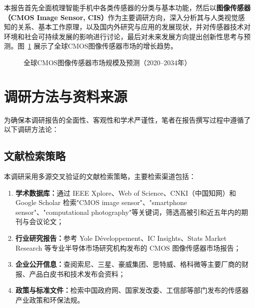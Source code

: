 \documentclass[12pt, a4paper]{ctexart}
\begin{document}
本报告首先全面梳理智能手机中各类传感器的分类与基本功能，然后以\textbf{图像传感器（CMOS Image Sensor, CIS）}作为主要调研方向，深入分析其与人类视觉感知的关系、基本工作原理，以及国内外研究与应用的发展现状，并对传感器技术对环境和社会可持续发展的影响进行讨论，最后对未来发展方向提出创新性思考与预测。图~\ref{fig:market_growth} 展示了全球CMOS图像传感器市场的增长趋势。

\begin{figure}[H]
\centering
{}
\caption{全球CMOS图像传感器市场规模及预测（2020--2034年）\cite{statsmarket2026}}
\label{fig:market_growth}
\end{figure}


\section{调研方法与资料来源}

为确保本调研报告的全面性、客观性和学术严谨性，笔者在报告撰写过程中遵循了以下调研方法论：

\subsection{文献检索策略}

本调研采用多源交叉验证的文献检索策略，主要检索渠道包括：
\begin{enumerate}[label=(\arabic*)]
    \item \textbf{学术数据库：}通过 IEEE Xplore、Web of Science、CNKI（中国知网）和 Google Scholar 检索"CMOS image sensor"、"smartphone sensor"、"computational photography"等关键词，筛选高被引和近五年内的期刊与会议论文；
    \item \textbf{行业研究报告：}参考 Yole Développement、IC Insights、Stats Market Research 等专业半导体市场研究机构发布的 CMOS 图像传感器市场报告；
    \item \textbf{企业公开信息：}查阅索尼、三星、豪威集团、思特威、格科微等主要厂商的财报、产品白皮书和技术发布会资料；
    \item \textbf{政策与标准文件：}检索中国政府网、国家发改委、工信部等部门发布的传感器产业政策和环保法规。
\end{enumerate}
\end{document}
